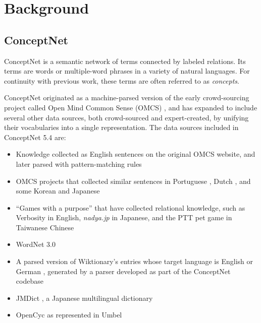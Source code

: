 \documentclass[11pt,letterpaper]{article}
\begin{document}

\section{Background}

\subsection{ConceptNet}
ConceptNet \cite{speer2012conceptnet} is a semantic network of terms
connected by labeled relations. Its terms are words or multiple-word phrases
in a variety of natural languages. For continuity with previous work,
these terms are often referred to as {\em concepts}.

ConceptNet originated as a machine-parsed version of the early crowd-sourcing
project called Open Mind Common Sense (OMCS) \cite{singh2002omcs}, and has expanded
to include several other data sources, both crowd-sourced and expert-created,
by unifying their vocabularies into a single representation.
The data sources included in ConceptNet 5.4 are:

\begin{itemize}
\item Knowledge collected as English sentences on the original OMCS website,
    and later parsed with pattern-matching rules
\item OMCS projects that collected similar sentences in Portuguese
    \cite{anacleto2006portuguese},
    Dutch \cite{eckhardt2008kid}, and some Korean and Japanese
    \cite{chung2006globalmind}
\item ``Games with a purpose'' that have collected relational knowledge, such as
    Verbosity \cite{vonahn2006verbosity} in English, {\em nadya.jp}
    \cite{nakahara2011nadya} in Japanese, and the PTT pet game \cite{kuo2009petgame}
    in Taiwanese Chinese
\item WordNet 3.0 \cite{miller1998wordnet}
\item A parsed version of Wiktionary's entries whose target language is English
      or German \cite{wiktionary2014en} \cite{wiktionary2014de}, generated
      by a parser developed as part of the ConceptNet codebase
\item JMDict \cite{breen2004jmdict}, a Japanese multilingual dictionary
\item OpenCyc \cite{matuszek2006cyc} as represented in Umbel \cite{bergman2008umbel}
\end{itemize}
\end{document}

